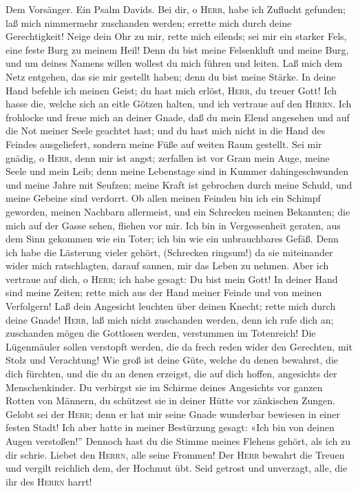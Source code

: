  Dem Vorsänger. Ein Psalm Davids. Bei dir, o
\textsc{Herr}, habe ich Zuflucht gefunden; laß mich nimmermehr
zuschanden werden; errette mich durch deine Gerechtigkeit!
 Neige dein Ohr zu mir, rette mich eilends; sei mir ein
starker Fels, eine feste Burg zu meinem Heil!  Denn du
bist meine Felsenkluft und meine Burg, und um deines Namens willen
wollest du mich führen und leiten.  Laß mich dem Netz
entgehen, das sie mir gestellt haben; denn du bist meine Stärke.
 In deine Hand befehle ich meinen Geist; du hast mich
erlöst, \textsc{Herr}, du treuer Gott!  Ich hasse die,
welche sich an eitle Götzen halten, und ich vertraue auf den
\textsc{Herrn}.  Ich frohlocke und freue mich an deiner
Gnade, daß du mein Elend angesehen und auf die Not meiner Seele geachtet
hast;  und du hast mich nicht in die Hand des Feindes
ausgeliefert, sondern meine Füße auf weiten Raum gestellt.
 Sei mir gnädig, o \textsc{Herr}, denn mir ist angst;
zerfallen ist vor Gram mein Auge, meine Seele und mein Leib;
 denn meine Lebenstage sind in Kummer dahingeschwunden
und meine Jahre mit Seufzen; meine Kraft ist gebrochen durch meine
Schuld, und meine Gebeine sind verdorrt.  Ob allen meinen
Feinden bin ich ein Schimpf geworden, meinen Nachbarn allermeist, und
ein Schrecken meinen Bekannten; die mich auf der Gasse sehen, fliehen
vor mir.  Ich bin in Vergessenheit geraten, aus dem Sinn
gekommen wie ein Toter; ich bin wie ein unbrauchbares Gefäß.
 Denn ich habe die Lästerung vieler gehört, (Schrecken
ringsum!) da sie miteinander wider mich ratschlagten, darauf sannen, mir
das Leben zu nehmen.  Aber ich vertraue auf dich, o
\textsc{Herr}; ich habe gesagt: Du bist mein Gott!  In
deiner Hand sind meine Zeiten; rette mich aus der Hand meiner Feinde und
von meinen Verfolgern!  Laß dein Angesicht leuchten über
deinen Knecht; rette mich durch deine Gnade! 
\textsc{Herr}, laß mich nicht zuschanden werden, denn ich rufe dich an;
zuschanden mögen die Gottlosen werden, verstummen im Totenreich!
 Die Lügenmäuler sollen verstopft werden, die da frech
reden wider den Gerechten, mit Stolz und Verachtung!  Wie
groß ist deine Güte, welche du denen bewahrst, die dich fürchten, und
die du an denen erzeigst, die auf dich hoffen, angesichts der
Menschenkinder.  Du verbirgst sie im Schirme deines
Angesichts vor ganzen Rotten von Männern, du schützest sie in deiner
Hütte vor zänkischen Zungen.  Gelobt sei der
\textsc{Herr}; denn er hat mir seine Gnade wunderbar bewiesen in einer
festen Stadt!  Ich aber hatte in meiner Bestürzung
gesagt: «Ich bin von deinen Augen verstoßen!'' Dennoch hast du die
Stimme meines Flehens gehört, als ich zu dir schrie. 
Liebet den \textsc{Herrn}, alle seine Frommen! Der \textsc{Herr} bewahrt
die Treuen und vergilt reichlich dem, der Hochmut übt. 
Seid getrost und unverzagt, alle, die ihr des \textsc{Herrn} harrt!

